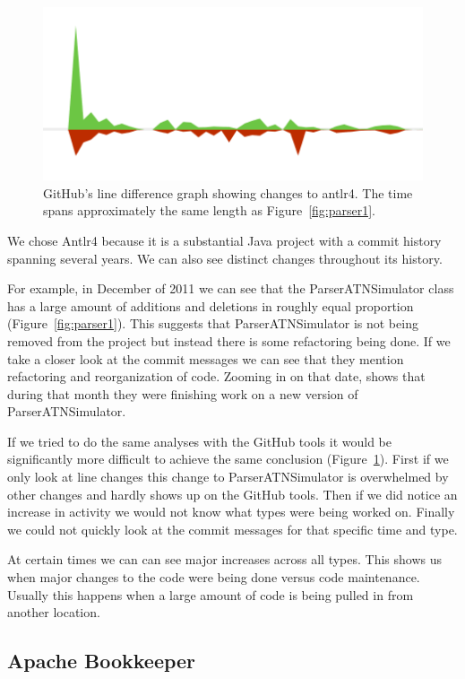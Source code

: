 \documentclass[conference]{IEEEtran}
\begin{document}
\begin{figure}[!ht]
\centering
\includegraphics[width=\columnwidth]{Antlr4-GH-Lines-ParserATNSimulator}
\caption{GitHub's line difference graph showing changes to antlr4. The time spans approximately the same length as Figure~\ref{fig:parser1}.}
\label{fig:parser2}
\end{figure}


We chose Antlr4 because it is a substantial Java project with a commit history spanning several years. We can also see distinct changes throughout its history.

For example, in December of 2011 we can see that the ParserATNSimulator class has a large amount of additions and deletions in roughly equal proportion (Figure~\ref{fig:parser1}). This suggests that ParserATNSimulator is not being removed from the project but instead there is some refactoring being done. If we take a closer look at the commit messages we can see that they mention refactoring and reorganization of code. Zooming in on that date,  shows that during that month they were finishing work on a new version of ParserATNSimulator.


If we tried to do the same analyses with the GitHub tools it would be significantly more difficult to achieve the same conclusion (Figure~\ref{fig:parser2}). First if we only look at line changes this change to ParserATNSimulator is overwhelmed by other changes and hardly shows up on the GitHub tools. Then if we did notice an increase in activity we would not know what types were being worked on. Finally we could not quickly look at the commit messages for that specific time and type.

At certain times we can can see major increases across all types. This shows us when major changes to the code were being done versus code maintenance. Usually this happens when a large amount of code is being pulled in from another location.

\subsection{Apache Bookkeeper}
\end{document}
